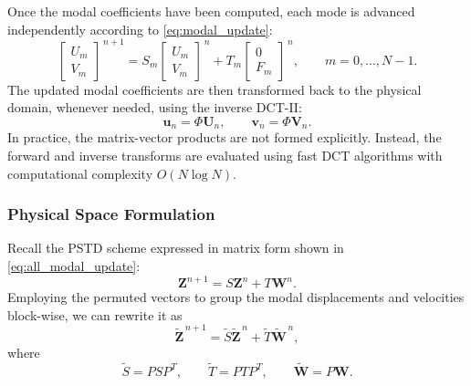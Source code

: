 \documentclass{Configuration_Files/PoliMi3i_thesis}
\begin{document}
Once the modal coefficients have been computed, each mode is advanced independently according to \eqref{eq:modal_update}:
\begin{equation*}
    \begin{bmatrix}
    U_m\\
    V_m
    \end{bmatrix}^{\,n+1}
    =
    S_m
    \begin{bmatrix}
    U_m\\
    V_m
    \end{bmatrix}^{\,n}
    +
    T_m
    \begin{bmatrix}
    0\\
    F_m
    \end{bmatrix}^{\,n},
    \qquad
    m=0,\ldots,N-1.
\end{equation*}
The updated modal coefficients are then transformed back to the physical domain,
whenever needed, using the inverse DCT-II:
\begin{equation*}
\mathbf u_n
=
\Phi\mathbf U_n,
\qquad
\mathbf v_n
=
\Phi\mathbf V_n.
\end{equation*}
In practice, the matrix-vector products are not formed explicitly. Instead, the
forward and inverse transforms are evaluated using fast DCT algorithms with
computational complexity $O(N\log N)$.

\subsubsection{Physical Space Formulation}
Recall the PSTD scheme expressed in matrix form shown in \eqref{eq:all_modal_update}:
\begin{equation*}
    \mathbf Z^{n+1}
    =
    S\mathbf Z^n
    +
    T\mathbf W^n.
\end{equation*}
Employing the permuted vectors to group the modal displacements and velocities block-wise, we can rewrite it as
\begin{equation*}
\widetilde{\mathbf Z}^{\,n+1}
=
\widetilde S
\widetilde{\mathbf Z}^{\,n}
+
\widetilde T
\widetilde{\mathbf W}^{\,n},
\end{equation*}
where
\begin{equation*}
\widetilde S
=
PSP^T,
\qquad
\widetilde T
=
PTP^T,
\qquad
\widetilde{\mathbf W}
=
P\mathbf W.
\end{equation*}
\end{document}
